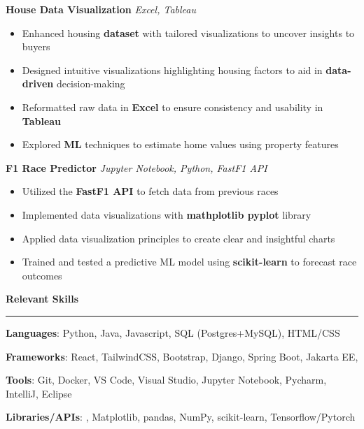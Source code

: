 \documentclass[11pt]{article}
\begin{document}
\textbf{House Data Visualization {\textbar}}
\textit{
    {
    Excel, 
    Tableau}
}
\begin{itemize}[itemsep=0pt, topsep=0pt]
    \item Enhanced housing \textbf{dataset} with tailored visualizations to uncover insights to buyers
    \item Designed intuitive visualizations highlighting housing factors to aid in \textbf{data-driven} decision-making
    \item Reformatted raw data in \textbf{Excel} to ensure consistency and usability in \textbf{Tableau}
    \item Explored \textbf{ML} techniques to estimate home values using property features
\end{itemize}

\textbf{F1 Race Predictor {\textbar}}
\textit{
    {
    Jupyter Notebook, 
    Python, 
    FastF1 API
    }
}
\begin{itemize}[itemsep=0pt, topsep=0pt]
    \item Utilized the \textbf{FastF1 API} to fetch data from previous races
    \item Implemented data visualizations with \textbf{mathplotlib pyplot} library
    \item Applied data visualization principles to create clear and insightful charts
    \item Trained and tested a predictive ML model using \textbf{scikit-learn} to forecast race outcomes
\end{itemize}


\textbf{Relevant Skills}
\vspace{-10pt}
\newline
\rule{\textwidth}{0.4pt}

\textbf{Languages}: Python, Java, Javascript, SQL (Postgres+MySQL), HTML/CSS

\textbf{Frameworks}: React, TailwindCSS, Bootstrap, Django, Spring Boot, Jakarta EE, 

\textbf{Tools}: Git, Docker, VS Code, Visual Studio, Jupyter Notebook, Pycharm, IntelliJ, Eclipse

\textbf{Libraries/APIs}: , Matplotlib, pandas, NumPy, scikit-learn, Tensorflow/Pytorch

\end{document}

